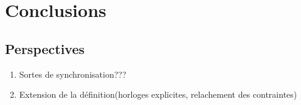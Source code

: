 \documentclass[11pt,a4paper,twoside]{epig}
\begin{document}
\section{Conclusions}

\subsection{Perspectives}

\begin{enumerate}
 \item Sortes de synchronisation???
 \item Extension de la définition(horloges explicites, relachement des contraintes)
\end{enumerate}






\appendix

\clearpage
\appendix
\end{document}

